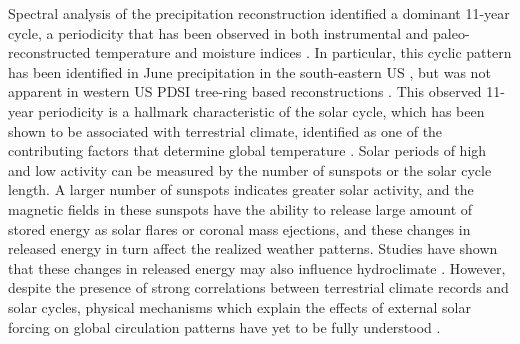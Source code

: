 Spectral analysis of the precipitation reconstruction identified a dominant 11-year cycle, a periodicity that has been observed in both instrumental and paleo-reconstructed temperature and moisture indices \cite{hancock1979cross, lassen1995variability}. In particular, this cyclic pattern has been identified in June precipitation in the south-eastern US \cite{hancock1979cross}, but was not apparent in western US PDSI tree-ring based reconstructions \cite{cook1997new}. This observed 11-year periodicity is a hallmark characteristic of the solar cycle, which has been shown to be associated with terrestrial climate, identified as one of the contributing factors that determine global temperature \cite{reid2002solar, national1994Solar, lassen1995variability}. Solar periods of high and low activity can be measured by the number of sunspots or the solar cycle length. A larger number of sunspots indicates greater solar activity, and the magnetic fields in these sunspots have the ability to release large amount of stored energy as solar flares or coronal mass ejections, and these changes in released energy in turn affect the realized weather patterns.  Studies have shown that these changes in released energy may also influence hydroclimate \cite{nichols2012hydroclimate, hancock1979cross}. However, despite the presence of strong correlations between terrestrial climate records and solar cycles, physical mechanisms which explain the effects of external solar forcing on global circulation patterns have yet to be fully understood \cite{franks2002assessing}. 
